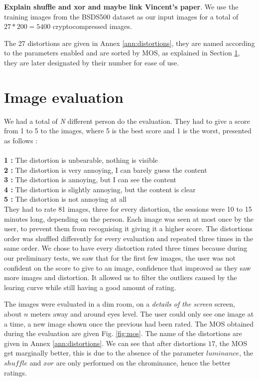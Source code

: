 \documentclass{article}
\begin{document}
\textbf{Explain shuffle and xor and maybe link Vincent's paper}. We use the training images from the BSDS500 \cite{bsds500} dataset as our input images for a total of $27 * 200 = 5400$ cryptocompressed images.

The 27 distortions are given in Annex \ref{ann:distortions}, they are named according to the parameters enabled and are sorted by MOS, as explained in Section \ref{sec:evaluation}, they are later designated by their number for ease of use.

\section{Image evaluation}
\label{sec:evaluation}
We had a total of \textit{N} different person do the evaluation. They had to give a score from 1 to 5 to the images, where 5 is the best score and 1 is the worst, presented as follows :\\\\
\textbf{1 :} The distortion is unbearable, nothing is visible\\
\textbf{2 :} \small{The distortion is very annoying, I can barely guess the content}\normalsize{}\\
\textbf{3 :} The distortion is annoying, but I can see the content\\
\textbf{4 :} The distortion is slightly annoying, but the content is clear\\
\textbf{5 :} The distortion is not annoying at all \\

They had to rate 81 images, three for every distortion, the sessions were 10 to 15 minutes long, depending on the person. Each image was seen at most once by the user, to prevent them from recognising it giving it a higher score. The distortions order was shuffled differently for every evaluation and repeated three times in the same order. We chose to have every distortion rated three times because during our preliminary tests, we saw that for the first few images, the user was not confident on the score to give to an image, confidence that improved as they saw more images and distortion. It allowed us to filter the outliers caused by the learing curve while still having a good amount of rating.

The images were evaluated in a dim room, on a \textit{details of the screen} screen, about $n$ meters away and around eyes level. The user could only see one image at a time, a new image shown once the previous had been rated.
The MOS obtained during the evaluation are given Fig. \ref{fig:mos}. The name of the distortions are given in Annex \ref{ann:distortions}. We can see that after distortions $17$, the MOS get marginally better, this is due to the absence of the parameter $luminance$, the $shuffle$ and $xor$ are only performed on the chrominance, hence the better ratings.
\end{document}
